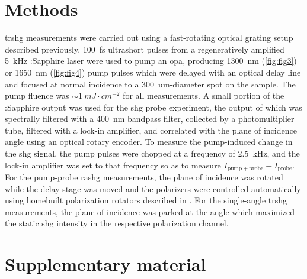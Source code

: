 \section{Methods}\label{sec:methods}
\Gls{trshg} measurements were carried out using a fast-rotating optical grating setup described previously\citep{fichera_second_2020,harter_high-speed_2015,torchinsky_low_2014}.
\qty{100}{fs} ultrashort pulses from a regeneratively amplified \qty{5}{kHz} :Sapphire laser were used to pump an \gls{opa}, producing \qty{1300}{nm} (\cref{fig:fig3}) or \qty{1650}{nm} (\cref{fig:fig4}) pump pulses which were delayed with an optical delay line and focused at normal incidence to a \qty{300}{um}-diameter spot on the sample.
The pump fluence was $\sim \qty{1}{mJ\cdot cm^{-2}}$ for all measurements.
A small portion of the :Sapphire output was used for the \gls{shg} probe experiment, the output of which was spectrally filtered with a \qty{400}{nm} bandpass filter, collected by a photomultiplier tube, filtered with a lock-in amplifier, and correlated with the plane of incidence angle using an optical rotary encoder.
To measure the pump-induced change in the \gls{shg} signal, the pump pulses were chopped at a frequency of \qty{2.5}{kHz}, and the lock-in amplifier was set to that frequency so as to measure $I_{\mathrm{pump}+\mathrm{probe}}-I_\mathrm{probe}$.
For the pump-probe \gls{rashg} measurements, the plane of incidence was rotated while the delay stage was moved and the polarizers were controlled automatically using homebuilt polarization rotators described in \citet{morey_automated_2024}.
For the single-angle \gls{trshg} measurements, the plane of incidence was parked at the angle which maximized the static \gls{shg} intensity in the respective polarization channel.

\section{Supplementary material}

